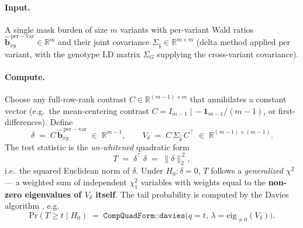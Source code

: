 \documentclass[11pt]{article}
\begin{document}
\paragraph{Input.} A single mask burden of size $m$ variants with per-variant Wald ratios $\hat{\boldsymbol b}_{xy}^{\,\mathrm{per-var}}\in\mathbb{R}^m$ and their joint covariance $\Sigma_{\hat b}\in\mathbb{R}^{m\times m}$ (delta method applied per variant, with the genotype LD matrix $\Sigma_G$ supplying the cross-variant covariance).

\paragraph{Compute.} Choose any full-row-rank contrast $C\in\mathbb{R}^{(m-1)\times m}$ that annihilates a constant vector (e.g.\ the mean-centering contrast $C = I_{m-1} \;|\, -\mathbf{1}_{m-1}/(m-1)$, or first-differences). Define
\begin{equation}
\delta \;=\; C\,\hat{\boldsymbol b}_{xy}^{\,\mathrm{per-var}} \;\in\; \mathbb{R}^{m-1},\qquad V_\delta \;=\; C\,\Sigma_{\hat b}\,C^\top \;\in\; \mathbb{R}^{(m-1)\times(m-1)}.
\label{eq:contrast}
\end{equation}
The test statistic is the \emph{un-whitened} quadratic form
\begin{equation}
T \;=\; \delta^\top\, \delta \;=\; \|\delta\|_2^{\,2},
\label{eq:Theidi}
\end{equation}
i.e.\ the squared Euclidean norm of $\delta$. Under $H_0:\delta=0$, $T$ follows a \emph{generalized $\chi^2$} --- a weighted sum of independent $\chi^2_1$ variables with weights equal to the \textbf{non-zero eigenvalues of $V_\delta$ itself}. The tail probability is computed by the Davies algorithm \citep{Davies1980,Kuonen1999}, e.g.\
\begin{equation}
\mathrm{Pr}(T \ge t \mid H_0) \;=\; \texttt{CompQuadForm::davies}\bigl(q = t,\, \lambda = \mathrm{eig}_{\ne 0}(V_\delta)\bigr).
\label{eq:davies}
\end{equation}
\end{document}
